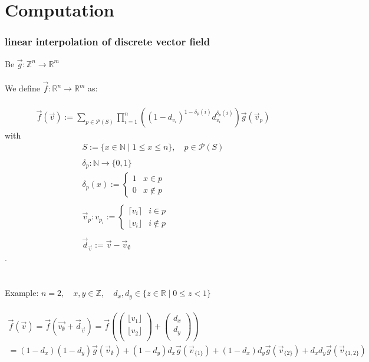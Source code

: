 \documentclass[a4paper]{article}
\newcommand*{\vecdd}[2]{\begin{pmatrix}#1\\#2\\\end{pmatrix}}
\begin{document}
\part{Computation}
\section{linear interpolation of discrete vector field}
Be $\vec{g}:\mathbb{Z}^n\rightarrow\mathbb{R}^m$\\\\
We define $\vec{f}:\mathbb{R}^n\rightarrow\mathbb{R}^m$ as:\\\\
\begin{align*}
  \vec{f}(\vec{v}):=\sum_{p\in\mathcal{P}(S)}^{}\prod_{i=1}^{n}\left((1-d_{v_i})^{1-\delta_p(i)}d_{v_i}^{\delta_p(i)}\right)\vec{g}(\vec{v}_p)
\end{align*}
with
\begin{align*}
  S:=\{x\in\mathbb{N} \mid 1\leq x\leq n\},\quad p\in\mathcal{P}(S)\\\\
  \delta_p:\mathbb{N}\rightarrow\{0,1\}\\
  \delta_p(x):=
  \begin{cases}
    1&x\in p\\
    0&x\not\in p
  \end{cases}\\\\
  \vec{v}_p:v_{p_i}:=
  \begin{cases}
    \lceil v_i\rceil&i\in p\\
    \lfloor v_i\rfloor&i\not\in p
  \end{cases}\\\\
  \vec{d}_{\vec{v}}:=\vec{v}-\vec{v}_{\emptyset}
\end{align*}
.
\\\\\\
Example: $n=2,\quad x,y\in\mathbb{Z},\quad d_x,d_y\in \{z\in\mathbb{R}\mid 0\leq z<1\}$\\\\
\begin{align*}
  \vec{f}(\vec{v})=\vec{f}(\vec{v_{\emptyset}}+\vec{d}_{\vec{v}})=\vec{f}(\vecdd{\lfloor v_1\rfloor}{\lfloor v_2 \rfloor}+\vecdd{d_x}{d_y})\\
  =(1-d_x)(1-d_y)\vec{g}(\vec{v}_{\emptyset})+(1-d_y)d_x\vec{g}(\vec{v}_{\{1\}})+(1-d_x)d_y\vec{g}(\vec{v}_{\{2\}})+d_xd_y\vec{g}(\vec{v}_{\{1,2\}})
\end{align*}
\newpage
\end{document}
